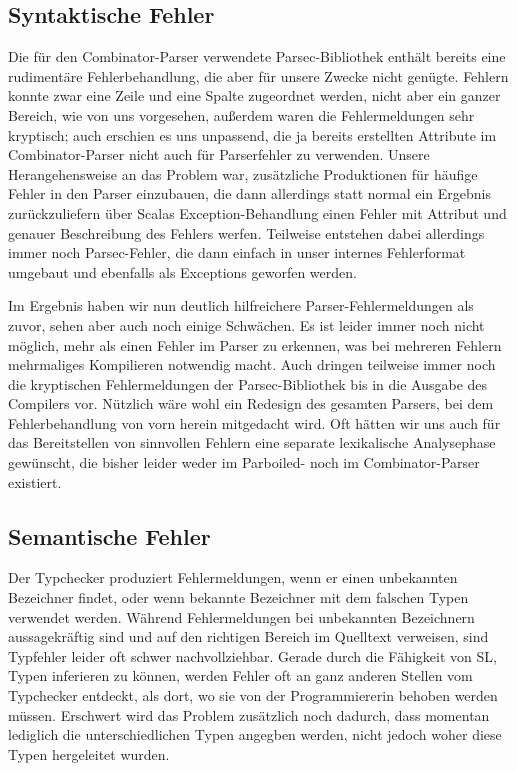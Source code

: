 \documentclass[runningheads]{llncs}
\begin{document}
\subsection{Syntaktische Fehler}
Die für den Combinator-Parser verwendete Parsec-Bibliothek enthält
bereits eine rudimentäre Fehlerbehandlung, die aber für unsere Zwecke
nicht genügte.  Fehlern konnte zwar eine Zeile und eine Spalte
zugeordnet werden, nicht aber ein ganzer Bereich, wie von uns
vorgesehen, außerdem waren die Fehlermeldungen sehr kryptisch; auch
erschien es uns unpassend, die ja bereits erstellten Attribute im
Combinator-Parser nicht auch für Parserfehler zu verwenden.  Unsere
Herangehensweise an das Problem war, zusätzliche Produktionen für
häufige Fehler in den Parser einzubauen, die dann allerdings statt
normal ein Ergebnis zurückzuliefern über Scalas Exception-Behandlung
einen Fehler mit Attribut und genauer Beschreibung des Fehlers werfen.
Teilweise entstehen dabei allerdings immer noch Parsec-Fehler, die
dann einfach in unser internes Fehlerformat umgebaut und ebenfalls als
Exceptions geworfen werden.

Im Ergebnis haben wir nun deutlich hilfreichere Parser-Fehlermeldungen
als zuvor, sehen aber auch noch einige Schwächen. Es ist leider immer
noch nicht möglich, mehr als einen Fehler im Parser zu erkennen, was
bei mehreren Fehlern mehrmaliges Kompilieren notwendig macht.  Auch
dringen teilweise immer noch die kryptischen Fehlermeldungen der
Parsec-Bibliothek bis in die Ausgabe des Compilers vor.  Nützlich wäre
wohl ein Redesign des gesamten Parsers, bei dem Fehlerbehandlung von
vorn herein mitgedacht wird. Oft hätten wir uns auch für das
Bereitstellen von sinnvollen Fehlern eine separate lexikalische
Analysephase gewünscht, die bisher leider weder im Parboiled- noch im
Combinator-Parser existiert.

\subsection{Semantische Fehler}
Der Typchecker produziert Fehlermeldungen, wenn er einen unbekannten
Bezeichner findet, oder wenn bekannte Bezeichner mit dem falschen
Typen verwendet werden.  Während Fehlermeldungen bei unbekannten
Bezeichnern aussagekräftig sind und auf den richtigen Bereich im
Quelltext verweisen, sind Typfehler leider oft schwer
nachvollziehbar.  Gerade durch die Fähigkeit von SL, Typen inferieren
zu können, werden Fehler oft an ganz anderen Stellen vom Typchecker
entdeckt, als dort, wo sie von der Programmiererin behoben werden
müssen.  Erschwert wird das Problem zusätzlich noch dadurch, dass
momentan lediglich die unterschiedlichen Typen angegben werden, nicht
jedoch woher diese Typen hergeleitet wurden.
\end{document}
